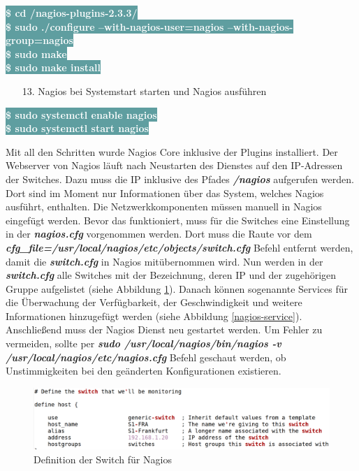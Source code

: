 \documentclass[fontsize=12pt,paper=a4,open=any,parskip=half,
  twoside=false,toc=listof,toc=bibliography,fleqn,leqno,
  captions=nooneline,captions=tableabove,british]{scrbook}
\begin{document}
\colorbox{CadetBlue}{\textcolor{white}{\textbf{\textsf{\$ cd /nagios-plugins-2.3.3/}}}}\\
\colorbox{CadetBlue}{\textcolor{white}{\textbf{\textsf{\$ sudo ./configure --with-nagios-user=nagios --with-nagios-group=nagios}}}}\\
\colorbox{CadetBlue}{\textcolor{white}{\textbf{\textsf{\$ sudo make}}}}\\
\colorbox{CadetBlue}{\textcolor{white}{\textbf{\textsf{\$ sudo make install}}}}
\begin{itemize}
\item[13.] Nagios bei Systemstart starten und Nagios ausführen
\end{itemize}
\colorbox{CadetBlue}{\textcolor{white}{\textbf{\textsf{\$ sudo systemctl enable nagios}}}}\\
\colorbox{CadetBlue}{\textcolor{white}{\textbf{\textsf{\$ sudo systemctl start nagios}}}}


Mit all den Schritten wurde Nagios Core inklusive der Plugins installiert. Der Webserver von Nagios läuft nach Neustarten des Dienstes auf den IP-Adressen der Switches. Dazu muss die IP inklusive des Pfades \textit{\textbf{/nagios}} aufgerufen werden. Dort sind im Moment nur Informationen über das System, welches Nagios ausführt, enthalten. Die Netzwerkkomponenten müssen manuell in Nagios eingefügt werden. Bevor das funktioniert, muss für die Switches eine Einstellung in der \textit{\textbf{nagios.cfg}} vorgenommen werden. Dort muss die Raute vor dem \textit{\textbf{cfg\_file=/usr/local/nagios/etc/objects/switch.cfg}} Befehl entfernt werden, damit die \textit{\textbf{switch.cfg}} in Nagios mitübernommen wird. Nun werden in der \textit{\textbf{switch.cfg}} alle Switches mit der Bezeichnung, deren IP und der zugehörigen Gruppe aufgelistet (siehe Abbildung \ref{nagios-switch}). Danach können sogenannte Services für die Überwachung der Verfügbarkeit, der Geschwindigkeit und weitere Informationen hinzugefügt werden (siehe Abbildung \ref{nagios-service}). Anschließend muss der Nagios Dienst neu gestartet werden. Um Fehler zu vermeiden, sollte per \textit{\textbf{sudo /usr/local/nagios/bin/nagios -v /usr/local/nagios/etc/nagios.cfg}} Befehl geschaut werden, ob Unstimmigkeiten bei den geänderten Konfigurationen existieren.\par

\begin{figure}[H]
 \centering
 \includegraphics[width=1.0\textwidth]{Bilder/nagios-switch}
 \captionsetup{justification=centering, margin=2cm}
 \caption{Definition der Switch für Nagios}
 \label{nagios-switch}
\end{figure}
\end{document}
